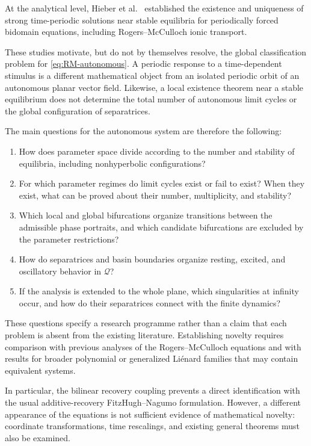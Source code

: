 \documentclass[11pt,reqno]{amsart}
\theoremstyle{plain}
\theoremstyle{definition}
\theoremstyle{remark}
\begin{document}
At the analytical level, Hieber et al.~\cite{Hieber2020}
established the existence and uniqueness of strong
time-periodic solutions near stable equilibria for
periodically forced bidomain equations, including
Rogers--McCulloch ionic transport.

These studies motivate, but do not by themselves resolve,
the global classification problem for
\eqref{eq:RM-autonomous}. A periodic response to a
time-dependent stimulus is a different mathematical
object from an isolated periodic orbit of an autonomous
planar vector field. Likewise, a local existence theorem
near a stable equilibrium does not determine the total
number of autonomous limit cycles or the global
configuration of separatrices.

The main questions for the autonomous system are therefore
the following:
\begin{enumerate}
\item
How does parameter space divide according to the number
and stability of equilibria, including nonhyperbolic
configurations?

\item
For which parameter regimes do limit cycles exist or
fail to exist? When they exist, what can be proved about
their number, multiplicity, and stability?

\item
Which local and global bifurcations organize transitions
between the admissible phase portraits, and which
candidate bifurcations are excluded by the parameter
restrictions?

\item
How do separatrices and basin boundaries organize
resting, excited, and oscillatory behavior in
$\mathcal Q$?

\item
If the analysis is extended to the whole plane, which
singularities at infinity occur, and how do their
separatrices connect with the finite dynamics?
\end{enumerate}

These questions specify a research programme rather than
a claim that each problem is absent from the existing
literature. Establishing novelty requires comparison
with previous analyses of the Rogers--McCulloch equations
and with results for broader polynomial or generalized
Li\'enard families that may contain equivalent systems.

In particular, the bilinear recovery coupling prevents
a direct identification with the usual additive-recovery
FitzHugh--Nagumo formulation. However, a different
appearance of the equations is not sufficient evidence
of mathematical novelty: coordinate transformations,
time rescalings, and existing general theorems must also
be examined.
\end{document}
